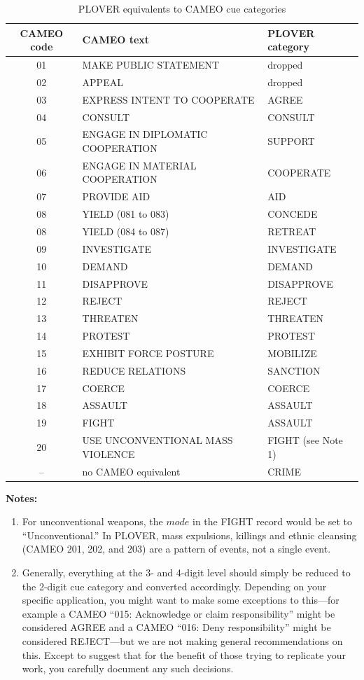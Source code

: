 \documentclass[11pt]{report}
\begin{document}
\begin{table}[htp]
\caption{PLOVER equivalents to CAMEO cue categories}
\begin{center}
\begin{tabular}{|c|l|l|}
\hline
CAMEO code & CAMEO text & PLOVER category \\
\hline
01 & MAKE PUBLIC STATEMENT & dropped \\
02 & APPEAL & dropped \\
03 & EXPRESS INTENT TO COOPERATE & AGREE \\
04 & CONSULT & CONSULT \\
05 & ENGAGE IN DIPLOMATIC COOPERATION & SUPPORT \\
06 & ENGAGE IN MATERIAL COOPERATION & COOPERATE \\
07 & PROVIDE AID & AID \\
08 & YIELD (081 to 083) & CONCEDE \\
08 & YIELD (084 to 087) & RETREAT \\
09 & INVESTIGATE & INVESTIGATE \\
10 & DEMAND & DEMAND \\
11 & DISAPPROVE & DISAPPROVE \\
12 & REJECT & REJECT \\
13 & THREATEN & THREATEN \\
14 & PROTEST & PROTEST \\
15& EXHIBIT FORCE POSTURE & MOBILIZE \\
16 & REDUCE RELATIONS & SANCTION \\
17 & COERCE & COERCE \\
18 & ASSAULT & ASSAULT \\
19 & FIGHT & ASSAULT \\
20 & USE UNCONVENTIONAL MASS VIOLENCE & FIGHT (see Note 1) \\
-- & no CAMEO equivalent & CRIME \\
\hline

\end{tabular}
\end{center}
\label{tab:xlate}
\end{table}%

\noindent \textbf{Notes:}

\begin{enumerate}
\item For unconventional weapons, the  $mode$ in the FIGHT record would be set to ``Unconventional.'' In PLOVER, mass expulsions, killings and ethnic cleansing (CAMEO 201, 202, and 203) are a pattern of events, not a single event.
\item Generally, everything at the 3- and 4-digit level should simply be reduced to the 2-digit cue category and converted accordingly. Depending on your specific application, you might want to make some exceptions to this---for example a CAMEO  ``015: Acknowledge or claim responsibility'' might be considered AGREE and a CAMEO ``016: Deny responsibility'' might be considered REJECT---but we are not making general recommendations on this. Except to suggest that for the benefit of those trying to replicate your work, you carefully document any such decisions.
\end{enumerate}
\end{document}
